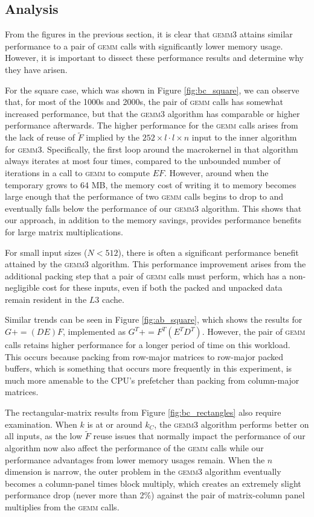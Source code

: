 \documentclass[12pt]{article}
\newcommand*{\pluseq}{\mathrel{{+}{=}}}
\newcommand*{\gemmt}{{\textsc{gemm3}}}
\newcommand*{\gemm}{{\textsc{gemm}}}
\begin{document}
\subsection{Analysis}
From the figures in the previous section, it is clear that \gemmt{} attains similar performance to a pair of \gemm{} calls with significantly lower memory usage.
However, it is important to dissect these performance results and determine why they have arisen.

For the square case, which was shown in Figure \ref{fig:bc_square}, we can observe that, for most of the 1000s and 2000s, the pair of \gemm{} calls has somewhat increased performance, but that the \gemmt{} algorithm has comparable or higher performance afterwards.
The higher performance for the \gemm{} calls arises from the lack of reuse of $\widetilde{F}$ implied by the $252 \times l \cdot l \times n$ input to the inner algorithm for \gemmt{}.
Specifically, the first loop around the macrokernel in that algorithm always iterates at most four times, compared to the unbounded number of iterations in a call to \gemm{} to compute $EF$.
However, around when the temporary grows to 64 MB, the memory cost of writing it to memory becomes large enough that the performance of two \gemm{} calls begins to drop to and eventually falls below the performance of our \gemmt{} algorithm.
This shows that our approach, in addition to the memory savings, provides performance benefits for large matrix multiplications.

For small input sizes ($N < 512$), there is often a significant performance benefit attained by the \gemmt{} algorithm.
This performance improvement arises from the additional packing step that a pair of \gemm{} calls must perform, which has a non-negligible cost for these inputs, even if both the packed and unpacked data remain resident in the $L3$ cache.

Similar trends can be seen in Figure \ref{fig:ab_square}, which shows the results for $G \pluseq (DE)F$, implemented as $G^T \pluseq F^T(E^TD^T)$.
However, the pair of \gemm{} calls retains higher performance for a longer period of time on this workload.
This occurs because packing from row-major matrices to row-major packed buffers, which is something that occurs more frequently in this experiment, is much more amenable to the CPU's prefetcher than packing from column-major matrices.

The rectangular-matrix results from Figure \ref{fig:bc_rectangles} also require examination.
When $k$ is at or around $k_C$, the \gemmt{} algorithm performs better on all inputs, as the low $\widetilde{F}$ reuse issues that normally impact the performance of our algorithm now also affect the performance of the \gemm{} calls while our performance advantages from lower memory usages remain.
When the $n$ dimension is narrow, the outer problem in the \gemmt{} algorithm eventually becomes a column-panel times block multiply, which creates an extremely slight performance drop (never more than 2\%) against the pair of matrix-column panel multiplies from the \gemm{} calls.
\end{document}
